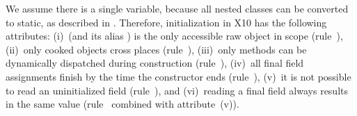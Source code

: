 We assume there is a single \this variable, because all nested classes can be converted to static,
    as described in .
Therefore, initialization in X10 has the following attributes:
(i)~\this (and its alias ) is the only accessible raw object in scope (rule~),
(ii)~only cooked objects cross places (rule~),
(iii)~only  methods can be dynamically dispatched during construction (rule~),
(iv)~all final field assignments finish by the time the constructor ends (rule~),
(v)~it is not possible to read an uninitialized field (rule~), and
(vi)~reading a final field always results in the same value (rule~ combined with attribute~(v)).
